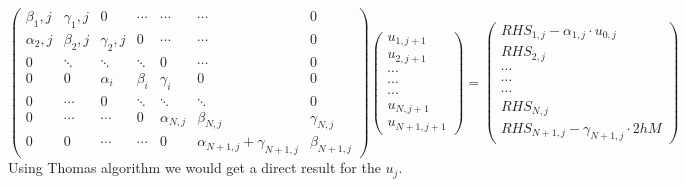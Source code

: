 \documentclass[11pt, a4paper]{article}
\begin{document}
\begin{equation}
    \begin{pmatrix}
        \beta_1,j & \gamma_1,j & 0 & \cdots & \cdots & \cdots & 0 \\
        \alpha_2,j & \beta_2,j & \gamma_2,j & 0 & \cdots & \cdots & 0 \\
        0 & \ddots & \ddots & \ddots & 0 & \cdots & 0 \\
        0 & 0 & \alpha_i & \beta_i & \gamma_i & 0 & 0 \\
        0 & \cdots & 0 & \ddots & \ddots & \ddots & 0 \\
        0 & \cdots & \cdots & 0 & \alpha_{N,j} & \beta_{N,j} & \gamma_{N,j} \\
        0 & 0 & \cdots & \cdots & 0 & \alpha_{N+1,j}+\gamma_{N+1,j} &\beta_{N+1,j}
    \end{pmatrix}
    \begin{pmatrix}
        u_{1,j+1} \\
        u_{2,j+1} \\
        \cdots \\
        \cdots \\
        \cdots \\
        u_{N,j+1} \\
        u_{N+1,j+1}
    \end{pmatrix}
    =
    \begin{pmatrix}
        RHS_{1,j}-\alpha_{1,j}\cdot u_{0,j} \\
        RHS_{2,j} \\
        \cdots \\
        \cdots \\
        \cdots \\
        RHS_{N,j} \\
        RHS_{N+1,j}-\gamma_{N+1,j}\cdot2hM
    \end{pmatrix}
\end{equation}
Using Thomas algorithm we would get a direct result for the $u_j$.
\end{document}
